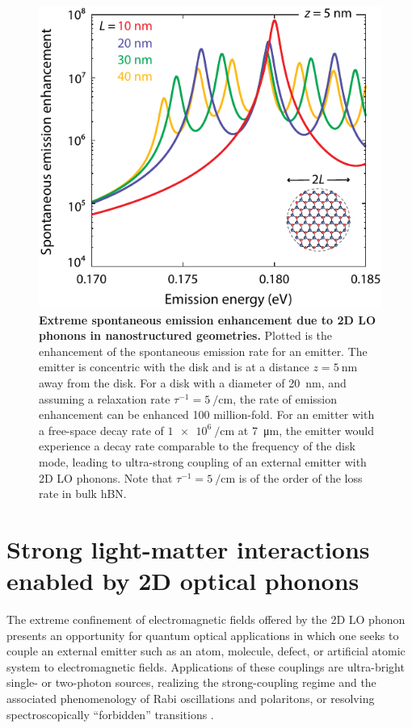 \documentclass[aps,prb,twocolumn,
	           groupedaddress,superscriptaddress,
               amsfonts,amssymb,amsmath,floatfix,
	           citeautoscript]{revtex4-1}
\begin{document}
\begin{figure}[t]
    \includegraphics[width=0.95\linewidth]{fig3.pdf}
    \caption{%
        \textbf{Extreme spontaneous emission enhancement due to 2D LO phonons in nanostructured geometries.} Plotted is the enhancement of the spontaneous emission rate for an emitter. The emitter is concentric with the disk and is at a distance $z=\SI{5}{\nm}$ away from the disk. For a disk with a diameter of \SI{20}{\nm}, and assuming a relaxation rate $\tau^{-1} = \SI{5}{\per\cm}$, the rate of emission enhancement can be enhanced \num{100} million-fold. For an emitter with a free-space decay rate of $\SI{1e6}{\per\cm}$ at \SI{7}{\micro\m}, the emitter would experience a decay rate comparable to the frequency of the disk mode, leading to ultra-strong coupling of an external emitter with 2D LO phonons. Note that $\tau^{-1} = \SI{5}{\per\cm}$ is of the order of the loss rate in bulk hBN.
        \label{fig:3}
        }
\end{figure}

\section{Strong light-matter interactions enabled by 2D optical phonons}

The extreme confinement of electromagnetic fields offered by the 2D LO phonon presents an opportunity for quantum optical applications in which one seeks to couple an external emitter such as an atom, molecule, defect, or artificial atomic system to electromagnetic fields. Applications of these couplings are ultra-bright single- or two-photon sources, realizing the strong-coupling regime and the associated phenomenology of Rabi oscillations and polaritons, or resolving spectroscopically ``forbidden'' transitions \cite{koppens2011graphene,autore2018boron,rivera2016shrinking,rivera2017making,kurman2018control}.
\end{document}
